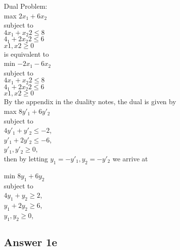 \documentclass[twoside]{article}
\begin{document}
Dual Problem: \\

max $2x_{1} + 6x_{2}$ \\
subject to\\
$4x_{1} + x_2{2} \leq 8 $\\
$4_{1} + 2x_2{2} \leq 6 $\\
$x1,x2 \geq 0 $\\
is equivalent to\\

min $-2x_{1} - 6x_{2}$ \\
subject to\\
$4x_{1} + x_2{2} \leq 8 $\\
$4_{1} + 2x_2{2} \leq 6 $\\
$x1,x2 \geq 0 $\\

By the appendix in the duality notes, the dual is given by\\

max $8y'_{1} + 6y'_{2}$\\
subject to\\
$4y'_{1} + y'_{2} \leq -2$,\\
$y'_{1} + 2y'_{2} \leq -6$,\\
$y'_{1}, y'_{2} \geq 0$,\\
then by letting $y_{1} = -y'_{1},y_{2} = -y'_{2}$
we arrive at 

min $8y_{1} + 6y_{2}$\\
subject to\\
$4y_{1} + y_{2} \geq 2$,\\
$y_{1} + 2y_{2} \geq 6$,\\
$y_{1}, y_{2} \geq 0$,\\

\subsection{Answer 1e}
\end{document}
